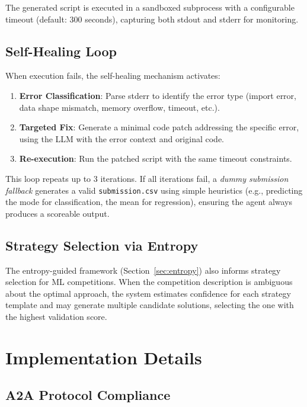 \documentclass[11pt]{article}
\begin{document}
The generated script is executed in a sandboxed subprocess with a configurable timeout (default: 300 seconds), capturing both stdout and stderr for monitoring.

\subsection{Self-Healing Loop}

When execution fails, the self-healing mechanism activates:

\begin{enumerate}[leftmargin=*,itemsep=1pt]
  \item \textbf{Error Classification}: Parse stderr to identify the error type (import error, data shape mismatch, memory overflow, timeout, etc.).
  \item \textbf{Targeted Fix}: Generate a minimal code patch addressing the specific error, using the LLM with the error context and original code.
  \item \textbf{Re-execution}: Run the patched script with the same timeout constraints.
\end{enumerate}

This loop repeats up to 3 iterations. If all iterations fail, a \emph{dummy submission fallback} generates a valid \texttt{submission.csv} using simple heuristics (e.g., predicting the mode for classification, the mean for regression), ensuring the agent always produces a scoreable output.

\subsection{Strategy Selection via Entropy}

The entropy-guided framework (Section~\ref{sec:entropy}) also informs strategy selection for ML competitions. When the competition description is ambiguous about the optimal approach, the system estimates confidence for each strategy template and may generate multiple candidate solutions, selecting the one with the highest validation score.

\section{Implementation Details}
\label{sec:implementation}

\subsection{A2A Protocol Compliance}
\end{document}
